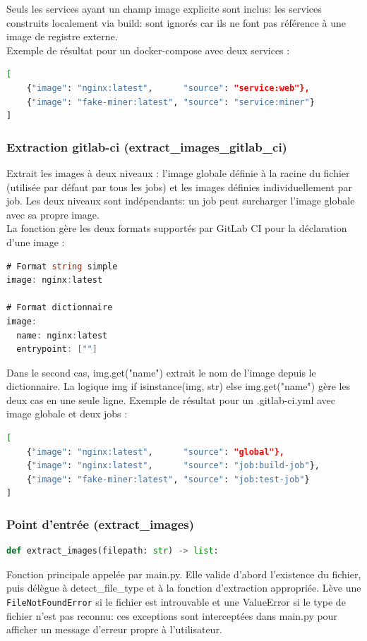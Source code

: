 Seuls les services ayant un champ image explicite sont inclus: les services construits localement via build: sont ignorés car ils ne font pas référence à une image de registre externe. \\

Exemple de résultat pour un docker-compose avec deux services : \\
\begin{lstlisting}[language=bash, caption=Logique de détection]
[
    {"image": "nginx:latest",      "source": "service:web"},
    {"image": "fake-miner:latest", "source": "service:miner"}
]
\end{lstlisting}
\subsubsection{Extraction gitlab-ci (extract\_images\_gitlab\_ci)}
Extrait les images à deux niveaux : l'image globale définie à la racine du fichier (utilisée par défaut par tous les jobs) et les images définies individuellement par job. Les deux niveaux sont indépendants:  un job peut surcharger l'image globale avec sa propre image. \\

La fonction gère les deux formats supportés par GitLab CI pour la déclaration d'une image : \\

\begin{lstlisting}[language=go, caption=Information d'extraction]
# Format string simple
image: nginx:latest

# Format dictionnaire
image:
  name: nginx:latest
  entrypoint: [""]

\end{lstlisting}
Dans le second cas, img.get("name") extrait le nom de l'image depuis le dictionnaire. La logique img if isinstance(img, str) else img.get("name") gère les deux cas en une seule ligne.
\newline
Exemple de résultat pour un .gitlab-ci.yml avec image globale et deux jobs :
\begin{lstlisting}[language=bash, caption=Logique de détection]
[
    {"image": "nginx:latest",      "source": "global"},
    {"image": "nginx:latest",      "source": "job:build-job"},
    {"image": "fake-miner:latest", "source": "job:test-job"}
]
\end{lstlisting}
\subsubsection{Point d'entrée (extract\_images)}
\begin{lstlisting}[language=python, caption=Point d'entrée de l'extraction]
    def extract_images(filepath: str) -> list:
\end{lstlisting}
Fonction principale appelée par main.py. Elle valide d'abord l'existence du fichier, puis délègue à detect\_file\_type et à la fonction d'extraction appropriée. Lève une \texttt{FileNotFoundError} si le fichier est introuvable et une ValueError si le type de fichier n'est pas reconnu: ces exceptions sont interceptées dans main.py pour afficher un message d'erreur propre à l'utilisateur. \\
